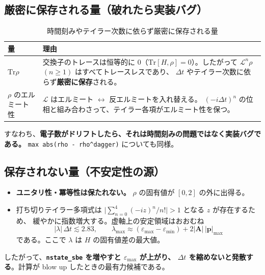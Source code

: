 \documentclass[dvipdfmx,a4paper,11pt]{jsarticle}
\newcommand{\file}[1]{\texttt{#1}}
\newcommand{\vA}{\bm{A}}
\newcommand{\vp}{\bm{p}}
\newcommand{\Tr}{\mathrm{Tr}}
\newcommand{\eps}{\varepsilon}
\newcommand{\dt}{\Delta t}
\begin{document}
\subsection{厳密に保存される量（破れたら実装バグ）}

\begin{table}[htbp]
\centering
\caption{時間刻みやテイラー次数に依らず厳密に保存される量}
\label{tab:invariants}
\begin{tabular}{@{}lp{95mm}@{}}
\toprule
\textbf{量} & \textbf{理由} \\
\midrule
$\Tr \rho$ &
交換子のトレースは恒等的に $0$（$\Tr[H,\rho] = 0$）。したがって
$\mathcal{L}^n\rho$ $(n \ge 1)$ はすべてトレースレスであり、
$\dt$ やテイラー次数に依らず\textbf{厳密に保存}される。 \\[2mm]
$\rho$ のエルミート性 &
$\mathcal{L}$ はエルミート $\leftrightarrow$ 反エルミートを入れ替える。
$(-i\dt)^n$ の位相と組み合わさって、テイラー各項がエルミート性を保つ。 \\
\bottomrule
\end{tabular}
\end{table}

すなわち、\textbf{電子数がドリフトしたら、それは時間刻みの問題ではなく実装バグである。}
\verb|max abs(rho - rho^dagger)| についても同様。

\subsection{保存されない量（不安定性の源）}

\begin{itemize}
\item \textbf{ユニタリ性・冪等性は保たれない。}
      $\rho$ の固有値が $[0,2]$ の外に出得る。
\item 打ち切りテイラー多項式は
      $\bigl|\sum_{n=0}^{4} (-iz)^n/n!\bigr| > 1$ となる $z$ が存在するため、
      緩やかに指数増大する。虚軸上の安定領域はおおむね
      \begin{equation}
        |\lambda|\,\dt \lesssim 2.83,
        \qquad
        \lambda_{\max} \approx (\eps_{\max} - \eps_{\min}) + 2|\vA|\,|\vp|_{\max}
        \label{eq:stability}
      \end{equation}
      である。ここで $\lambda$ は $H$ の固有値差の最大値。
\end{itemize}

したがって、\textbf{\file{nstate\_sbe} を増やすと $\eps_{\max}$ が上がり、
$\dt$ を縮めないと発散する}。計算が blow up したときの最有力候補である。
\end{document}

